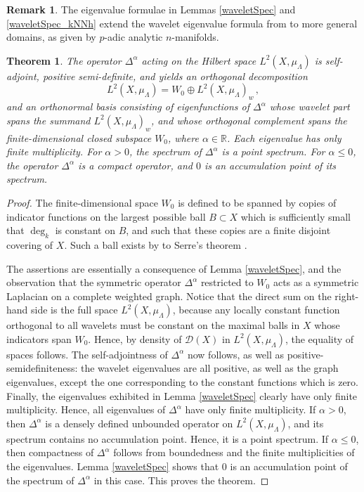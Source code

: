 \documentclass[a4paper,draft]{ZbRad}
\theoremstyle{plain}
\newtheorem{thm}{Theorem}[section]
\theoremstyle{definition}
\newtheorem{rem}{Remark}[section]
\numberwithin{equation}{section}
\renewcommand{\le}{\leqslant}\renewcommand{\leq}{\leqslant}
\begin{document}
\begin{rem}
The eigenvalue formulae in Lemmas \ref{waveletSpec} and \ref{waveletSpec_kNNh} extend the wavelet eigenvalue formula from \cite[Theorem 3]{Kozyrev2004} to more general domains, as given by $p$-adic analytic $n$-manifolds.
\end{rem}

\begin{thm}
The operator $\Delta^\alpha$ acting on the Hilbert space 
$L^2(X,\mu_\Lambda)$ is self-
adjoint, positive semi-deﬁnite, and yields an orthogonal decomposition
\[
L^2(X,\mu_\Lambda)
= W_0\oplus L^2(X,\mu_\Lambda)_w \,,
\]
and an orthonormal basis consisting of eigenfunctions of $\Delta^\alpha$ whose wavelet part
spans the summand 
$L^2(X,\mu_\Lambda)_w$, and whose orthogonal complement spans the
finite-dimensional closed subspace $W_0$, 
where $\alpha\in\mathbb{R}$. Each eigenvalue
has only finite multiplicity. For $\alpha > 0$, the spectrum of $\Delta^\alpha$ is a point spectrum.
For $\alpha\le 0$, the operator $\Delta^\alpha$ is a compact operator, and $0$ is an accumulation point
of its spectrum. 
\end{thm}

\begin{proof}
The finite-dimensional space $W_0$ is defined to be spanned by copies of indicator functions on the largest possible ball $B\subset X$ which is sufficiently small that $\deg_k$ is constant on $B$, and such that these copies are a finite disjoint covering of $X$. Such a ball exists by to Serre's theorem \cite[Th\'eor\`eme (1)]{Serre1965}. 

\smallskip
The assertions are essentially a consequence of 
Lemma \ref{waveletSpec}, and the observation that the symmetric operator $\Delta^\alpha$ restricted to $W_0$ acts as a symmetric Laplacian on a complete weighted graph. Notice that the direct sum on
the right-hand side is the full space $L^2(X,\mu_\Lambda)$, because any locally constant
function orthogonal to all wavelets must be constant on the maximal balls in
$X$ whose indicators span $W_0$. 
Hence, by density of $\mathcal{D}(X)$ in 
$L^2(X,\mu_\Lambda)$, the equality of spaces follows.
The self-adjointness of $\Delta^\alpha$ now follows, as well as positive-semidefiniteness:
the wavelet eigenvalues are all positive, as well as the graph eigenvalues, except the one corresponding to the constant functions which is zero. Finally,
the eigenvalues exhibited in
Lemma \ref{waveletSpec} clearly have only finite multiplicity. Hence, all eigenvalues of $\Delta^\alpha$ have only finite multiplicity. If $\alpha>0$,
then $\Delta^\alpha$ is a densely defined unbounded operator on $L^2(X,\mu_\Lambda)$, and its spectrum contains no accumulation point. Hence, it is a point spectrum. If $\alpha \le 0$, then compactness of $\Delta^\alpha$ follows from boundedness and the finite multiplicities of the eigenvalues. Lemma \ref{waveletSpec} shows that $0$ is an accumulation
point of the spectrum of $\Delta^\alpha$ in this case. This proves the theorem.
\end{proof}
\end{document}
